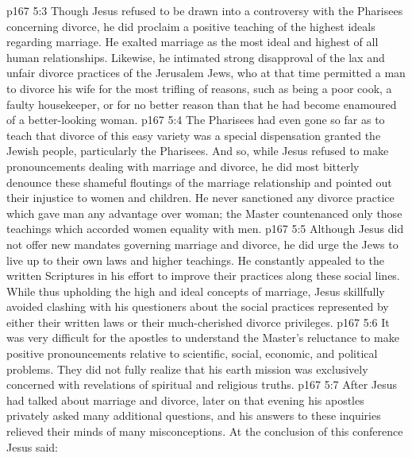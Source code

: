\vs p167 5:3 Though Jesus refused to be drawn into a controversy with the Pharisees concerning divorce, he did proclaim a positive teaching of the highest ideals regarding marriage. He exalted marriage as the most ideal and highest of all human relationships. Likewise, he intimated strong disapproval of the lax and unfair divorce practices of the Jerusalem Jews, who at that time permitted a man to divorce his wife for the most trifling of reasons, such as being a poor cook, a faulty housekeeper, or for no better reason than that he had become enamoured of a better\hyp{}looking woman.
\vs p167 5:4 The Pharisees had even gone so far as to teach that divorce of this easy variety was a special dispensation granted the Jewish people, particularly the Pharisees. And so, while Jesus refused to make pronouncements dealing with marriage and divorce, he did most bitterly denounce these shameful floutings of the marriage relationship and pointed out their injustice to women and children. He never sanctioned any divorce practice which gave man any advantage over woman; the Master countenanced only those teachings which accorded women equality with men.
\vs p167 5:5 Although Jesus did not offer new mandates governing marriage and divorce, he did urge the Jews to live up to their own laws and higher teachings. He constantly appealed to the written Scriptures in his effort to improve their practices along these social lines. While thus upholding the high and ideal concepts of marriage, Jesus skillfully avoided clashing with his questioners about the social practices represented by either their written laws or their much\hyp{}cherished divorce privileges.
\vs p167 5:6 It was very difficult for the apostles to understand the Master’s reluctance to make positive pronouncements relative to scientific, social, economic, and political problems. They did not fully realize that his earth mission was exclusively concerned with revelations of spiritual and religious truths.
\vs p167 5:7 After Jesus had talked about marriage and divorce, later on that evening his apostles privately asked many additional questions, and his answers to these inquiries relieved their minds of many misconceptions. At the conclusion of this conference Jesus said: 
